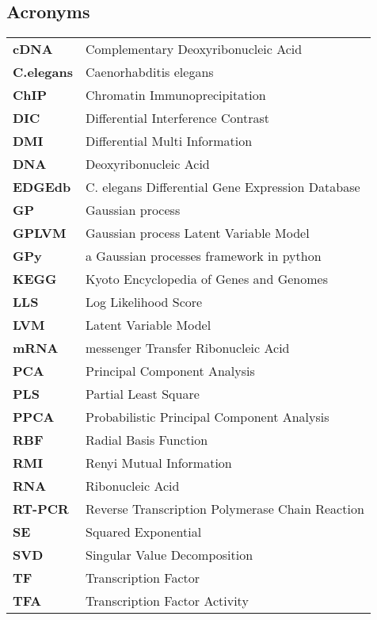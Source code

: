 \subsection{Acronyms}
\begin{table}[!htbp]
\renewcommand{\arraystretch}{1.3}
\begin{tabular}{l | l }
      \textbf{cDNA} & {Complementary Deoxyribonucleic Acid}\\
      \textbf{C.elegans} & {Caenorhabditis elegans} \\
      \textbf{ChIP} & {Chromatin Immunoprecipitation} \\
      \textbf{DIC} & {Differential Interference Contrast}\\ 
      \textbf{DMI} & {Differential Multi Information}\\
      \textbf{DNA} & {Deoxyribonucleic Acid} \\
      \textbf{EDGEdb} & {C. elegans Differential Gene Expression Database} \\
      \textbf{GP} & {Gaussian process} \\
      \textbf{GPLVM} & {Gaussian process Latent Variable Model} \\
      \textbf{GPy} & {a Gaussian processes framework in python} \\
      \textbf{KEGG} & {Kyoto Encyclopedia of Genes and Genomes} \\
      \textbf{LLS} & {Log Likelihood Score} \\
      \textbf{LVM} & {Latent Variable Model} \\
      \textbf{mRNA} & {messenger Transfer Ribonucleic Acid} \\
      \textbf{PCA} & {Principal Component Analysis}\\
      \textbf{PLS} & {Partial Least Square} \\
      \textbf{PPCA} & {Probabilistic Principal Component Analysis}\\
      \textbf{RBF} & {Radial Basis Function} \\
      \textbf{RMI} & {Renyi Mutual Information}\\
      \textbf{RNA} & {Ribonucleic Acid}\\
      \textbf{RT-PCR} & {Reverse Transcription Polymerase Chain Reaction} \\ %
      \textbf{SE} & {Squared Exponential} \\
      \textbf{SVD} & {Singular Value Decomposition} \\
      \textbf{TF} & {Transcription Factor} \\
      \textbf{TFA} & {Transcription Factor Activity} \\
  \end{tabular}
\end{table}

